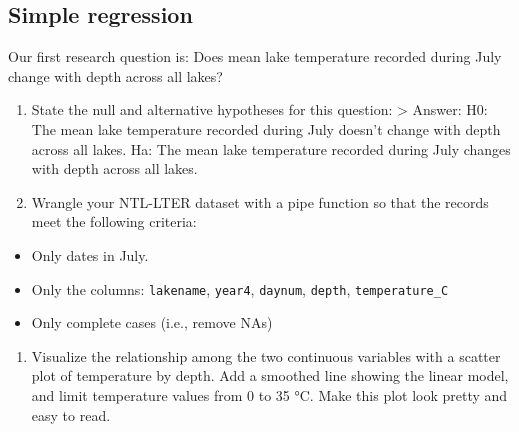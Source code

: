 \documentclass[
]{article}
\providecommand{\tightlist}{%
  \setlength{\itemsep}{0pt}\setlength{\parskip}{0pt}}
\begin{document}
\hypertarget{simple-regression}{%
\subsection{Simple regression}\label{simple-regression}}

Our first research question is: Does mean lake temperature recorded
during July change with depth across all lakes?

\begin{enumerate}
\def\labelenumi{\arabic{enumi}.}
\setcounter{enumi}{2}
\item
  State the null and alternative hypotheses for this question:
  \textgreater{} Answer: H0: The mean lake temperature recorded during
  July doesn't change with depth across all lakes. Ha: The mean lake
  temperature recorded during July changes with depth across all lakes.
\item
  Wrangle your NTL-LTER dataset with a pipe function so that the records
  meet the following criteria:
\end{enumerate}

\begin{itemize}
\tightlist
\item
  Only dates in July.
\item
  Only the columns: \texttt{lakename}, \texttt{year4}, \texttt{daynum},
  \texttt{depth}, \texttt{temperature\_C}
\item
  Only complete cases (i.e., remove NAs)
\end{itemize}

\begin{enumerate}
\def\labelenumi{\arabic{enumi}.}
\setcounter{enumi}{4}
\tightlist
\item
  Visualize the relationship among the two continuous variables with a
  scatter plot of temperature by depth. Add a smoothed line showing the
  linear model, and limit temperature values from 0 to 35 °C. Make this
  plot look pretty and easy to read.
\end{enumerate}
\end{document}
